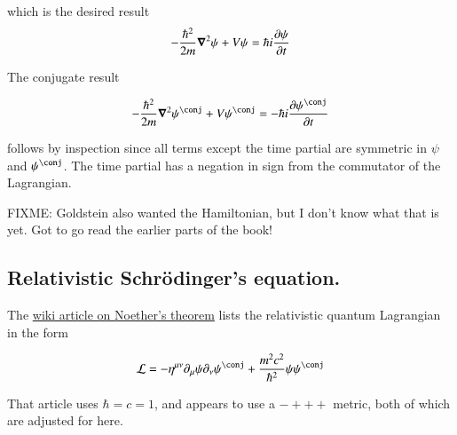 which is the desired result
\begin{align*}
-\frac{\hbar^2}{2 m} \boldsymbol{\nabla}^2 \psi + V\psi &= {\hbar i}{} \frac{\partial {\psi}}{\partial {t}} \\
\end{align*}

The conjugate result

%
\begin{align}\label{eqn:fieldLag:schrod}
-\frac{\hbar^2}{2 m} \spacegrad^2 \psi^\conj + V\psi^\conj &= -{\hbar i}{} \PD{t}{\psi^\conj} \\
\end{align}

follows by inspection since all terms except the time partial are symmetric in $\psi$ and $\psi^\conj$.  The time partial has a negation in sign from the commutator of the Lagrangian.

FIXME: Goldstein also wanted the Hamiltonian, but I don't know what that is yet.  Got to go read the earlier parts of the book!

\subsection{Relativistic Schr\"{o}dinger's equation. }

The 
\href{http://en.wikipedia.org/wiki/Noether%27s_theorem}{wiki article on Noether's theorem} lists the relativistic quantum Lagrangian in the form

\begin{align*}
\LL = -\eta^{\mu\nu}\partial_\mu \psi \partial_\nu \psi^\conj + \frac{m^2 c^2}{\hbar^2}\psi \psi^\conj
\end{align*}

That article uses $\hbar = c = 1$, and appears to use a $-+++$ metric, both 
of which are adjusted for here.

